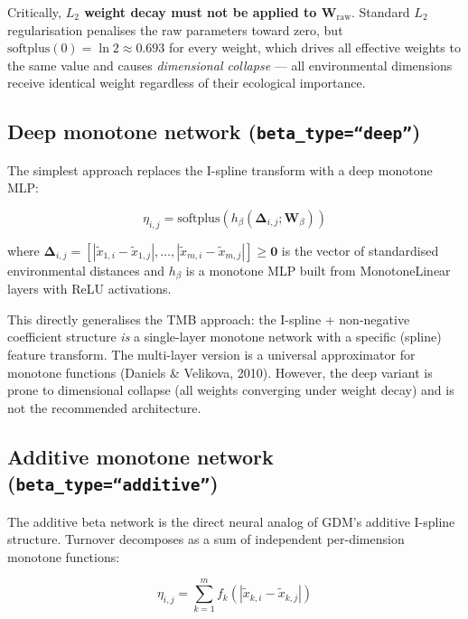 \documentclass{article}
\begin{document}
Critically, \textbf{$L_2$ weight decay must not be applied to $\mathbf{W}_{\text{raw}}$}. Standard $L_2$ regularisation penalises the raw parameters toward zero, but $\text{softplus}(0) = \ln 2 \approx 0.693$ for every weight, which drives all effective weights to the same value and causes \textit{dimensional collapse} --- all environmental dimensions receive identical weight regardless of their ecological importance.

\subsection{Deep monotone network (\texttt{beta\_type=``deep''})}

The simplest approach replaces the I-spline transform with a deep monotone MLP:

\begin{equation}
    \eta_{i,j} = \text{softplus}\!\left(h_\beta(\bm{\Delta}_{i,j}; \bm{W}_\beta)\right)
\end{equation}

where $\bm{\Delta}_{i,j} = \left[|\tilde{x}_{1,i} - \tilde{x}_{1,j}|, \ldots, |\tilde{x}_{m,i} - \tilde{x}_{m,j}|\right] \geq \mathbf{0}$ is the vector of standardised environmental distances and $h_\beta$ is a monotone MLP built from MonotoneLinear layers with ReLU activations.

This directly generalises the TMB approach: the I-spline + non-negative coefficient structure \textit{is} a single-layer monotone network with a specific (spline) feature transform. The multi-layer version is a universal approximator for monotone functions (Daniels \& Velikova, 2010). However, the deep variant is prone to dimensional collapse (all weights converging under weight decay) and is not the recommended architecture.

\subsection{Additive monotone network (\texttt{beta\_type=``additive''})}
\label{sec:additive-beta}

The additive beta network is the direct neural analog of GDM's additive I-spline structure. Turnover decomposes as a sum of independent per-dimension monotone functions:

\begin{equation}
    \eta_{i,j} = \sum_{k=1}^{m} f_k\!\left(|\tilde{x}_{k,i} - \tilde{x}_{k,j}|\right)
\end{equation}
\end{document}

